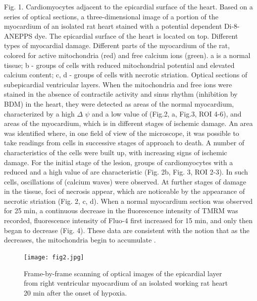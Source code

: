 \documentclass{biophys-new}
\begin{document}
Fig. 1. Cardiomyocytes adjacent to the epicardial surface of the heart.
Based on a series of optical sections, a three-dimensional image of a portion of the myocardium of an isolated rat heart stained with a potential dependent Di-8-ANEPPS dye.
The epicardial surface of the heart is located on top.
Different types of myocardial damage.
Different parts of the myocardium of the rat, colored for active mitochondria (red) and free calcium ions (green). a is a normal tissue; b - groups of cells with reduced mitochondrial potential and elevated calcium content; c, d - groups of cells with necrotic striation. Optical sections of subepicardial ventricular layers.
When the mitochondria and free  ions were stained in the absence of contractile activity and sinus rhythm (inhibition by BDM) in the heart, they were detected as areas of the normal myocardium, characterized by a high $\Delta$ $\psi$ and a low value of  (Fig.2, a, Fig.3, ROI 4-6), and areas of the myocardium, which is in different stages of ischemic damage.
An area was identified where, in one field of view of the microscope, it was possible to take readings from cells in successive stages of approach to death. A number of characteristics of the cells were built up, with increasing signs of ischemic damage.
For the initial stage of the lesion, groups of cardiomyocytes with a reduced and a high value of  are characteristic (Fig. 2b, Fig. 3, ROI 2-3). In such cells, oscillations of  (calcium waves) were observed. At further stages of damage in the tissue, foci of necrosis appear, which are noticeable by the appearance of necrotic striation (Fig. 2, c, d). When a normal myocardium section was observed for 25 min, a continuous decrease in the fluorescence intensity of TMRM was recorded, fluorescence intensity of Fluo-4 first increased for 15 min, and only then began to decrease (Fig. 4). These data are consistent with the notion that as the decreases, the mitochondria begin to accumulate .

\begin{figure}
    \texttt{[image: fig2.jpg]}
    \caption{Frame-by-frame scanning of optical images of the epicardial layer from right ventricular myocardium of an isolated working rat heart 20 min after the onset of hypoxia.}
    \label{fig:fig2}
\end{figure}
\end{document}
